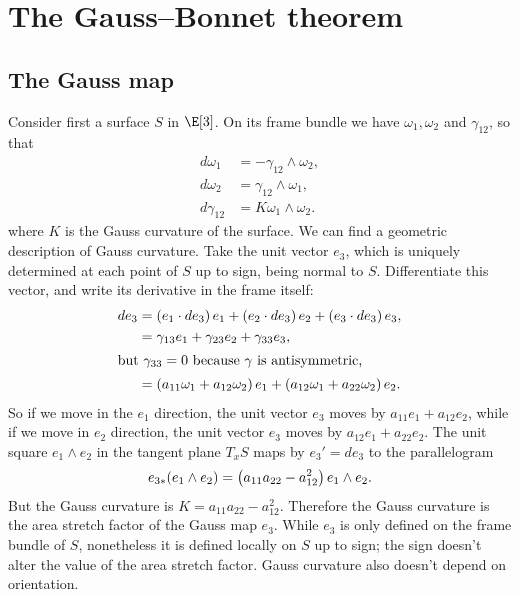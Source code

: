 \chapter{The Gauss--Bonnet theorem}\label{chapter:Gauss.Bonnet}%


\section{The Gauss map}
Consider first a surface \(S\) in \(\E[3]\).
On its frame bundle we have \(\omega_1, \omega_2\) and \(\gamma_{12}\), so that
\begin{align*}
 d\omega_1 &= - \gamma_{12} \wedge \omega_2, \\
 d\omega_2 &= \gamma_{12} \wedge \omega_1, \\
 d\gamma_{12} &= K \omega_1 \wedge \omega_2.
\end{align*}
where \(K\) is the Gauss curvature of the surface.
We can find a geometric description of Gauss curvature.
Take the unit vector \(e_3\), which is uniquely determined at each point of \(S\) up to sign, being normal to \(S\).
Differentiate this vector, and write its derivative in the frame itself:
\begin{align*}
 de_3 &= \left(e_1 \cdot de_3\right) e_1 + \left(e_2 \cdot de_3\right)e_2 + \left(e_3 \cdot de_3\right) e_3, \\
      &= \gamma_{13} e_1 + \gamma_{23} e_2 + \gamma_{33} e_3, \\
      \intertext{but \(\gamma_{33}=0\) because \(\gamma\) is antisymmetric,}
      &= \left(a_{11} \omega_1 + a_{12} \omega_2\right)e_1+\left(a_{12} \omega_1 + a_{22} \omega_2\right)e_2.
\end{align*}
So if we move in the \(e_1\) direction, the unit vector \(e_3\) moves by \(a_{11}e_1+a_{12}e_2\), while if we move in \(e_2\) direction, the unit vector \(e_3\) moves by \(a_{12}e_1+a_{22}e_2\).
The unit square \(e_1 \wedge e_2\) in the tangent plane \(T_x S\) maps by \(e_3'=de_3\) to the parallelogram
\[
 e_{3*} (e_1 \wedge e_2) = \left(a_{11} a_{22} - a_{12}^2\right) e_1 \wedge e_2.
\]
But the Gauss curvature is \(K = a_{11} a_{22} - a_{12}^2\).
Therefore the Gauss curvature is the area stretch factor of the Gauss map \(e_3\).
While \(e_3\) is only defined on the frame bundle of \(S\), nonetheless it is defined locally on \(S\) up to sign; the sign doesn't alter the value of the area stretch factor.
Gauss curvature also doesn't depend on orientation.

